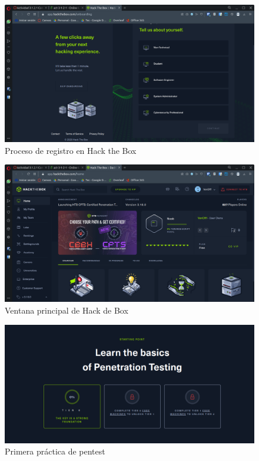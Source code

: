 \documentclass{article}
\begin{document}
        \begin{figure}[!htbp]
            \centering
            \includegraphics[scale=0.25]{img/htb-register-process.png}
            \caption{Proceso de registro en Hack the Box}
            \label{fig:proceso}
        \end{figure}

        \begin{figure}[!htbp]
            \centering
            \includegraphics[scale=0.25]{img/htb-interphase.png}
            \caption{Ventana principal de Hack de Box}
            \label{fig:interfaz}
        \end{figure}

        \begin{figure}[!htbp]
            \centering
            \includegraphics[scale=0.35]{img/htb-practice-welcome-screen.png}
            \caption{Primera práctica de pentest}
            \label{fig:htb-practice-welcome-screen}
        \end{figure}
\end{document}
